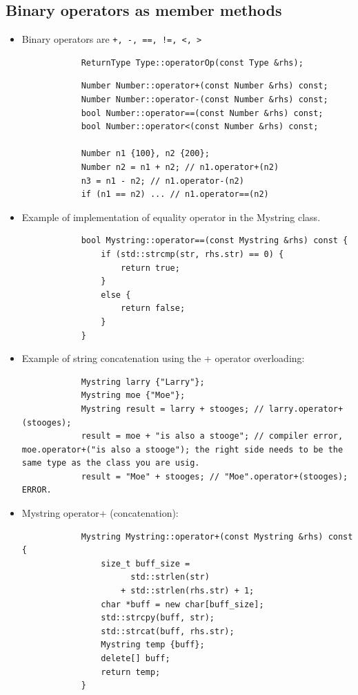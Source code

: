 \subsection{Binary operators as member methods}
\begin{itemize}
    \item Binary operators are \texttt{+, -, ==, !=, <, >}
        \begin{verbatim}
            ReturnType Type::operatorOp(const Type &rhs);
        \end{verbatim}
        \begin{verbatim}
            Number Number::operator+(const Number &rhs) const;
            Number Number::operator-(const Number &rhs) const;
            bool Number::operator==(const Number &rhs) const;
            bool Number::operator<(const Number &rhs) const;

            Number n1 {100}, n2 {200};
            Number n2 = n1 + n2; // n1.operator+(n2)
            n3 = n1 - n2; // n1.operator-(n2)
            if (n1 == n2) ... // n1.operator==(n2)
        \end{verbatim}
    
    \item Example of implementation of equality operator in the Mystring class.
        \begin{verbatim}
            bool Mystring::operator==(const Mystring &rhs) const {
                if (std::strcmp(str, rhs.str) == 0) {
                    return true;
                }
                else {
                    return false;
                }
            }
        \end{verbatim}
    
    \item Example of string concatenation using the + operator overloading:
        \begin{verbatim}
            Mystring larry {"Larry"};
            Mystring moe {"Moe"};
            Mystring result = larry + stooges; // larry.operator+(stooges);
            result = moe + "is also a stooge"; // compiler error, moe.operator+("is also a stooge"); the right side needs to be the same type as the class you are usig.
            result = "Moe" + stooges; // "Moe".operator+(stooges); ERROR.
        \end{verbatim}
    
    \item Mystring operator+ (concatenation):
        \begin{verbatim}
            Mystring Mystring::operator+(const Mystring &rhs) const {
                size_t buff_size = 
                      std::strlen(str) 
                    + std::strlen(rhs.str) + 1;
                char *buff = new char[buff_size];
                std::strcpy(buff, str);
                std::strcat(buff, rhs.str);
                Mystring temp {buff};
                delete[] buff;
                return temp;
            }
        \end{verbatim}
\end{itemize}

